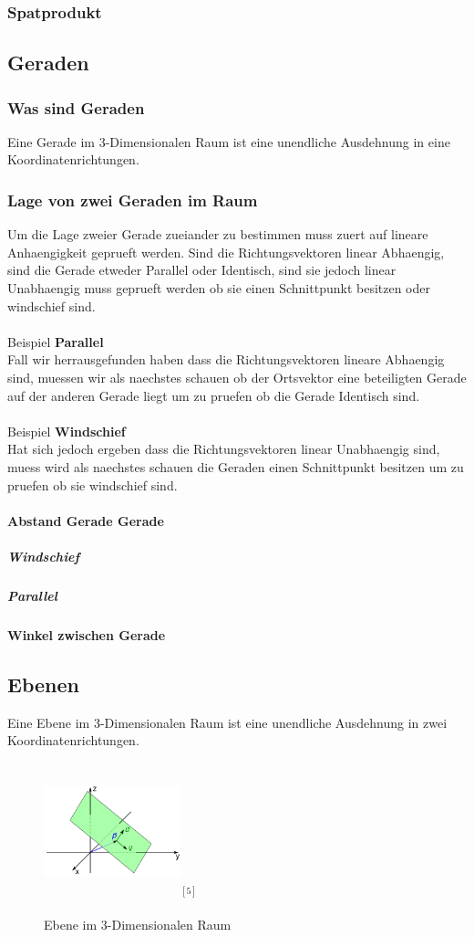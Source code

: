 \documentclass[a4paper]{article} %
\begin{document}
	\subsubsection{Spatprodukt}
	\subsection{Geraden}
	\subsubsection{Was sind Geraden}
	Eine Gerade im 3-Dimensionalen Raum ist eine unendliche Ausdehnung in eine Koordinatenrichtungen.
	\subsubsection{Lage von zwei Geraden im Raum}
	Um die Lage zweier Gerade zueiander zu bestimmen muss zuert auf lineare Anhaengigkeit geprueft werden.
	Sind die Richtungsvektoren linear Abhaengig, sind die Gerade etweder Parallel oder Identisch, sind sie jedoch linear Unabhaengig
	muss geprueft werden ob sie einen Schnittpunkt besitzen oder windschief sind.
	\\\\Beispiel \textbf{Parallel}
	\\Fall wir herrausgefunden haben dass die Richtungsvektoren lineare Abhaengig sind, muessen wir als naechstes schauen ob der Ortsvektor eine beteiligten Gerade auf der anderen Gerade liegt um zu pruefen ob die Gerade Identisch sind.
	\\\\Beispiel \textbf{Windschief}
	\\Hat sich jedoch ergeben dass die Richtungsvektoren linear  Unabhaengig sind, muess wird als naechstes schauen die Geraden einen Schnittpunkt besitzen um zu pruefen ob sie windschief sind.
	\paragraph{Abstand Gerade Gerade}
	\subparagraph{Windschief}
	\subparagraph{Parallel}
	\paragraph{Winkel zwischen Gerade}
	\subsection{Ebenen}
	Eine Ebene im 3-Dimensionalen Raum ist eine unendliche Ausdehnung in zwei Koordinatenrichtungen.
	\begin{figure}[H]
				\includegraphics[width=150px, height=150px]{Ebene.png}$^{[5]}$
					\captionsetup{labelformat=empty}
				\caption{Ebene im 3-Dimensionalen Raum}
	\end{figure}
\end{document}
